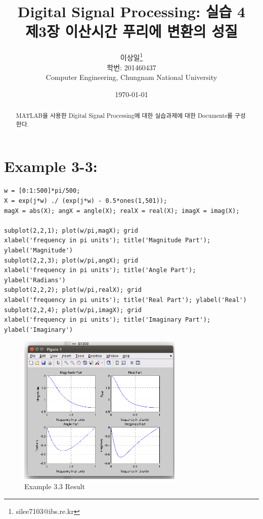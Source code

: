 \documentclass[11pt
  , a4paper
  , article
  , oneside
]{memoir}
\begin{document}
\newcommand{\technumber}{
  Digital Signal Processing using MATLAB\\
  Document 1: 2016-03-26}
\title{\textbf{Digital Signal Processing: 실습 4 \\
		제3장 이산시간 푸리에  변환의 성질 \\}}

\author{이상일\thanks{silee7103@ibs.re.kr} \\

  학번: 201460437\\
  Computer Engineering, Chungnam National University 
}
\date{\today}

\renewcommand{\maketitlehooka}{\begin{flushright}\textsf{\technumber}\end{flushright}}

\maketitle

\begin{abstract}
MATLAB을 사용한 Digital Signal Processing에 대한 실습과제에 대한 Documents를 구성한다.
\end{abstract}

\chapter{Example 3-3:}

\begin{lstlisting}[style=termstyle]
% Example 3.3
w = [0:1:500]*pi/500;  
X = exp(j*w) ./ (exp(j*w) - 0.5*ones(1,501));
magX = abs(X); angX = angle(X); realX = real(X); imagX = imag(X);

subplot(2,2,1); plot(w/pi,magX); grid
xlabel('frequency in pi units'); title('Magnitude Part'); ylabel('Magnitude')
subplot(2,2,3); plot(w/pi,angX); grid
xlabel('frequency in pi units'); title('Angle Part'); ylabel('Radians')
subplot(2,2,2); plot(w/pi,realX); grid
xlabel('frequency in pi units'); title('Real Part'); ylabel('Real')
subplot(2,2,4); plot(w/pi,imagX); grid
xlabel('frequency in pi units'); title('Imaginary Part'); ylabel('Imaginary')
\end{lstlisting}

\begin{figure}[h!]
	\centering
	\includegraphics[width=0.7\textwidth,height=0.2\textwidth]{./images/Ex3-3.png}
	\caption{Example 3.3 Result}
	\label{fig:Example 3-3 Result}
\end{figure}
\end{document}
